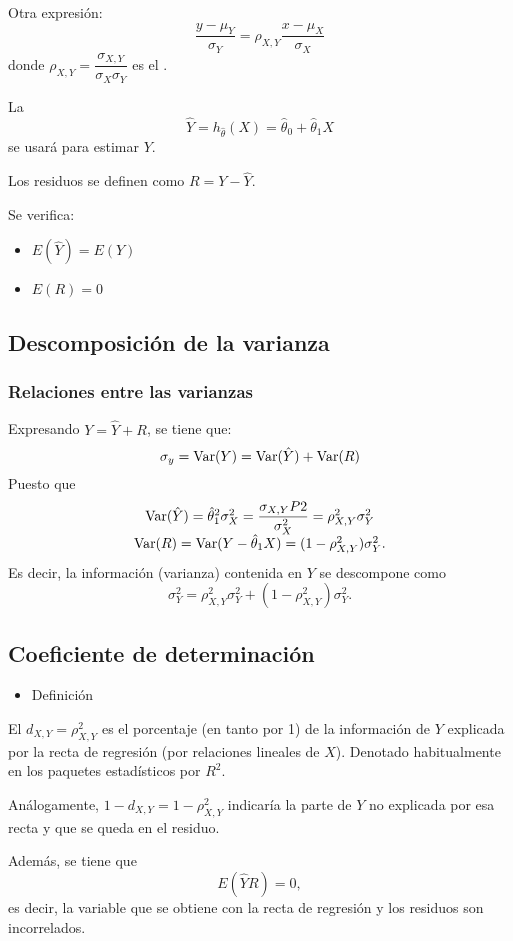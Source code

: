 Otra expresión: \[ \dfrac{y-\mu_Y}{\sigma_Y}=\rho_{X,Y}\dfrac{x-\mu_X}{\sigma_X} \]donde $\rho_{X,Y}=\dfrac{\sigma_{X,Y}}{\sigma_X\sigma_Y}$ es el .

La \va \[ \hat{Y}=h_{\hat{\theta}}(X)=\hat{\theta}_0+\hat{\theta}_1X \]se usará para estimar $Y$.

Los residuos se definen como $R=Y-\hat{Y}$.

Se verifica:
\begin{itemize}[label=\color{lightblue}$\to$]
\item $E(\hat{Y})=E(Y)$
\item $E(R)=0$
\end{itemize}
\subsection{Descomposición de la varianza}
\subsubsection{Relaciones entre las varianzas}
Expresando $Y=\hat{Y}+R$, se tiene que: \[ \sigma_y=\operatorname{Var}(Y)=\operatorname{Var}(\hat{Y})+\operatorname{Var}(R) \]
Puesto que \[ \begin{array}{c}
\operatorname{Var}(\hat{Y})=\hat{\theta}_1^2\sigma_X^2=\dfrac{\sigma_{X,Y}P2}{\sigma_X^2}=\rho_{X,Y}^2\sigma_Y^2\\
\operatorname{Var}(R)=\operatorname{Var}(Y-\hat{\theta}_1X)=(1-\rho_{X,Y}^2)\sigma_Y^2.
\end{array} \]
Es decir, la información (varianza) contenida en $Y$ se descompone como \[ \sigma_Y^2=\rho_{X,Y}^2\sigma_Y^2+(1-\rho_{X,Y}^2)\sigma_Y^2. \]
\subsection{Coeficiente de determinación}
\begin{itemize}[label=\color{red}\textbullet, leftmargin=*]
	\item \color{lightblue}Definición
\end{itemize}
El  $d_{X,Y}=\rho_{X,Y}^2$ es el porcentaje (en tanto por 1) de la información de $Y$ explicada por la recta de regresión (por relaciones lineales de $X$). Denotado habitualmente en los paquetes estadísticos por $R^2$.

Análogamente, $1-d_{X,Y}=1-\rho_{X,Y}^2$ indicaría la parte de $Y$ no explicada por esa recta y que se queda en el residuo.

Además, se tiene que \[ E(\hat{Y}R)=0, \] es decir, la variable que se obtiene con la recta de regresión y los residuos son incorrelados.

